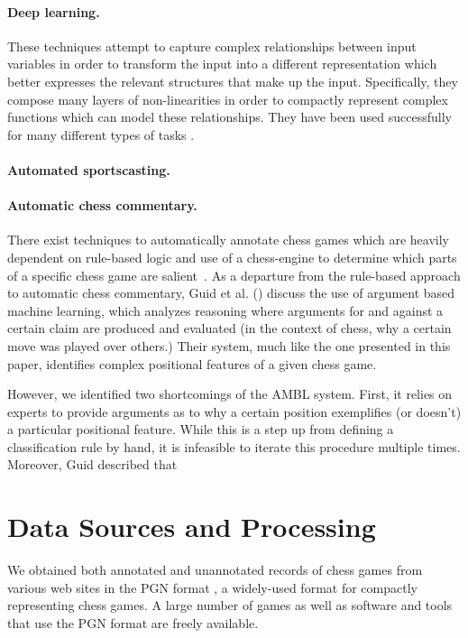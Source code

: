 \documentclass[11pt]{article}
\begin{document}
\paragraph{Deep learning.} These techniques attempt to capture complex relationships between input variables in order to transform the input into a different representation which better expresses the relevant structures that make up the input. Specifically, they compose many layers of non-linearities in order to compactly represent complex functions which can model these relationships. They have been used successfully for many different types of tasks \cite{ng-mnist,ng-vision,ng-nlp}.

\paragraph{Automated sportscasting.} 

\paragraph{Automatic chess commentary.} There exist techniques to automatically annotate chess games which are heavily dependent on rule-based logic and use of a chess-engine to determine which parts of a specific chess game are salient~\cite{cambridge-chess-annotation}. As a departure from the rule-based approach to automatic chess commentary, Guid et al. (\cite{learning-positional-features}) discuss the use of argument based machine learning, which analyzes reasoning where arguments for and against a certain claim are produced and evaluated (in the context of chess, why a certain move was played over others.) Their system, much like the one presented in this paper, identifies complex positional features of a given chess game.

However, we identified two shortcomings of the AMBL system.  First, it relies on experts to provide arguments as to why a certain position exemplifies (or doesn’t) a particular positional feature.  While this is a step up from defining a classification rule by hand, it is infeasible to iterate this procedure multiple times.  Moreover, Guid described that 

\section{Data Sources and Processing}
We obtained both annotated and unannotated records of chess games from various web sites in the PGN format \cite{pgn}, a widely-used format for compactly representing chess games. A large number of games as well as software and tools that use the PGN format are freely available. 
\end{document}
